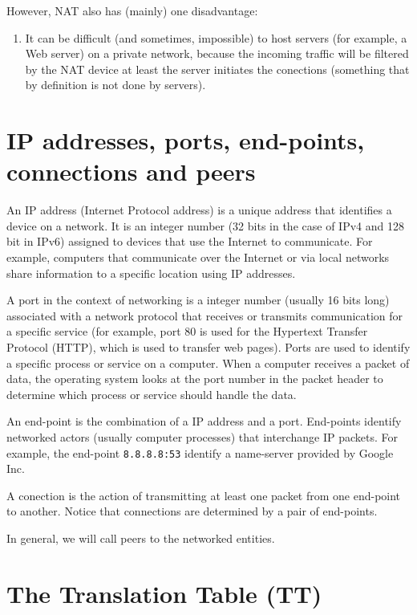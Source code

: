 However, NAT also has (mainly) one disadvantage:
\begin{enumerate}
\item It can be difficult (and sometimes, impossible) to host servers
  (for example, a Web server) on a private network, because the
  incoming traffic will be filtered by the NAT device at least the
  server initiates the conections (something that by definition is not
  done by servers).
\end{enumerate}

\section{IP addresses, ports, end-points, connections and peers}

An IP address (Internet Protocol address) is a unique address that
identifies a device on a network. It is an integer number (32 bits in
the case of IPv4 and 128 bit in IPv6) assigned to devices that use the
Internet to communicate. For example, computers that communicate over
the Internet or via local networks share information to a specific
location using IP addresses.

A port in the context of networking is a integer number (usually 16
bits long) associated with a network protocol that receives or
transmits communication for a specific service (for example, port 80
is used for the Hypertext Transfer Protocol (HTTP), which is used to
transfer web pages). Ports are used to identify a specific process or
service on a computer. When a computer receives a packet of data, the
operating system looks at the port number in the packet header to
determine which process or service should handle the data.

An end-point is the combination of a IP address and a port. End-points
identify networked actors (usually computer processes) that
interchange IP packets. For example, the end-point \texttt{8.8.8.8:53}
identify a name-server provided by Google Inc.

A conection is the action of transmitting at least one packet from one
end-point to another. Notice that connections are determined by a pair
of end-points.

In general, we will call peers to the networked entities.

\section{The Translation Table (TT)}

